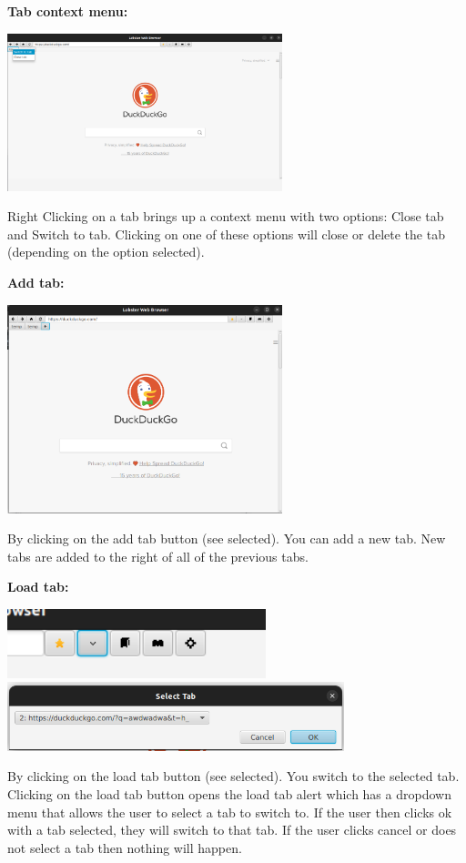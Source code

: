 \documentclass[10pt,a4paper]{report}
\begin{document}
	
	\LARGE \noindent \justifying \textbf{Tab context menu:} \par
	\noindent \includegraphics[width=80mm]{images/tabContextMenu.png} \par
	\normalsize \noindent Right Clicking on a tab brings up a context menu with two options: Close tab and Switch to tab. Clicking on one of these options will close or delete the tab (depending on the option selected). \par
	
	\pagebreak
	
	\LARGE \noindent \justifying \textbf{Add tab:} \par
	\noindent \includegraphics[width=80mm]{images/addTab.png} \par
	\normalsize \noindent By clicking on the add tab button (see selected). You can add a new tab. New tabs are added to the right of all of the previous tabs. \par
	
	
	\LARGE \noindent \justifying \textbf{Load tab:} \par
	\noindent \includegraphics[height=20mm]{images/loadTab.png}
	\noindent \includegraphics[height=20mm]{images/loadTabAlert.png} \par
	\normalsize \noindent By clicking on the load tab button (see selected). You switch to the selected tab. Clicking on the load tab button opens the load tab alert which has a dropdown menu that allows the user to select a tab to switch to. If the user then clicks ok with a tab selected, they will switch to that tab. If the user clicks cancel or does not select a tab then nothing will happen. \par
	
\end{document}
